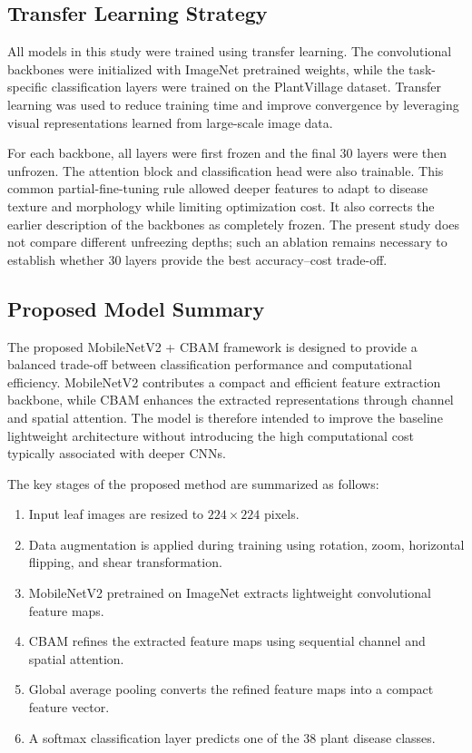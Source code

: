 \subsection{Transfer Learning Strategy}

All models in this study were trained using transfer learning. The convolutional backbones were initialized with ImageNet pretrained weights, while the task-specific classification layers were trained on the PlantVillage dataset. Transfer learning was used to reduce training time and improve convergence by leveraging visual representations learned from large-scale image data.

For each backbone, all layers were first frozen and the final 30 layers were then unfrozen. The attention block and classification head were also trainable. This common partial-fine-tuning rule allowed deeper features to adapt to disease texture and morphology while limiting optimization cost. It also corrects the earlier description of the backbones as completely frozen. The present study does not compare different unfreezing depths; such an ablation remains necessary to establish whether 30 layers provide the best accuracy--cost trade-off.

\subsection{Proposed Model Summary}

The proposed MobileNetV2 + CBAM framework is designed to provide a balanced trade-off between classification performance and computational efficiency. MobileNetV2 contributes a compact and efficient feature extraction backbone, while CBAM enhances the extracted representations through channel and spatial attention. The model is therefore intended to improve the baseline lightweight architecture without introducing the high computational cost typically associated with deeper CNNs.

The key stages of the proposed method are summarized as follows:

\begin{enumerate}
    \item Input leaf images are resized to $224 \times 224$ pixels.
    \item Data augmentation is applied during training using rotation, zoom, horizontal flipping, and shear transformation.
    \item MobileNetV2 pretrained on ImageNet extracts lightweight convolutional feature maps.
    \item CBAM refines the extracted feature maps using sequential channel and spatial attention.
    \item Global average pooling converts the refined feature maps into a compact feature vector.
    \item A softmax classification layer predicts one of the 38 plant disease classes.
\end{enumerate}

